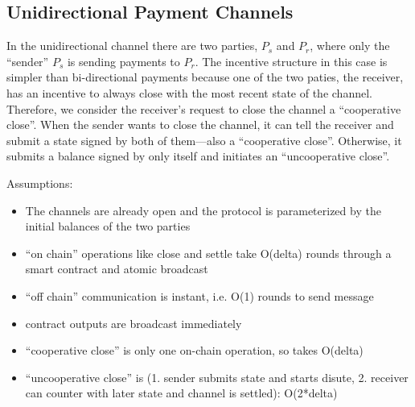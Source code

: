 \subsection{Unidirectional Payment Channels}

In the unidirectional channel there are two parties, $P_s$ and $P_r$, where only the ``sender'' $P_s$ is sending payments to $P_r$.
The incentive structure in this case is simpler than bi-directional payments because one of the two paties, the receiver, has an incentive to always close with the most recent state of the channel.
Therefore, we consider the receiver's request to close the channel a ``cooperative close''. 
When the sender wants to close the channel, it can tell the receiver and submit a state signed by both of them---also a ``cooperative close''.
Otherwise, it submits a balance signed by only itself and initiates an ``uncooperative close''.

Assumptions:
\begin{itemize}
  \item The channels are already open and the protocol is parameterized by the initial balances of the two parties
  \item ``on chain'' operations like close and settle take O(delta) rounds through a smart contract and atomic broadcast
  \item ``off chain'' communication is instant, i.e. O(1) rounds to send message
  \item contract outputs are broadcast immediately
  \item ``cooperative close'' is only one on-chain operation, so takes O(delta)
  \item ``uncooperative close'' is (1. sender submits state and starts disute, 2. receiver can counter with later state and channel is settled): O(2*delta)
\end{itemize}


%	
\begin{figure}[!htb]
	
\end{figure}

\begin{figure}[!htb]
	
\end{figure}

\begin{figure}[!htb]
	
\end{figure}


